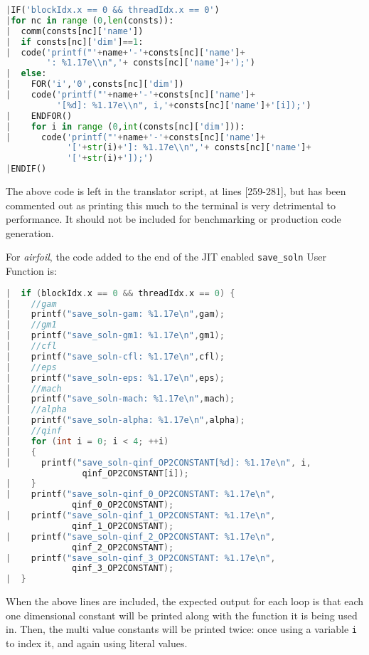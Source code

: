 \begin{lstlisting}[backgroundcolor=\color{lightgray!20}, language=Python]
|IF('blockIdx.x == 0 && threadIdx.x == 0')
|for nc in range (0,len(consts)):
|  comm(consts[nc]['name'])
|  if consts[nc]['dim']==1:
|  code('printf("'+name+'-'+consts[nc]['name']+
        ': %1.17e\\n",'+ consts[nc]['name']+');')
|  else:
|    FOR('i','0',consts[nc]['dim'])
|    code('printf("'+name+'-'+consts[nc]['name']+
          '[%d]: %1.17e\\n", i,'+consts[nc]['name']+'[i]);')
|    ENDFOR()
|    for i in range (0,int(consts[nc]['dim'])):
|      code('printf("'+name+'-'+consts[nc]['name']+
            '['+str(i)+']: %1.17e\\n",'+ consts[nc]['name']+
            '['+str(i)+']);')
|ENDIF()
\end{lstlisting}
The above code is left in the translator script, at lines [259-281], but has been commented out as printing this much to the terminal is very detrimental to performance. It should not be included for benchmarking or production code generation.
\par
For \textit{airfoil}, the code added to the end of the JIT enabled \verb|save_soln| User Function is:
\begin{lstlisting}[backgroundcolor=\color{red!20},language=C]
|  if (blockIdx.x == 0 && threadIdx.x == 0) {
|    //gam
|    printf("save_soln-gam: %1.17e\n",gam);
|    //gm1
|    printf("save_soln-gm1: %1.17e\n",gm1);
|    //cfl
|    printf("save_soln-cfl: %1.17e\n",cfl);
|    //eps
|    printf("save_soln-eps: %1.17e\n",eps);
|    //mach
|    printf("save_soln-mach: %1.17e\n",mach);
|    //alpha
|    printf("save_soln-alpha: %1.17e\n",alpha);
|    //qinf
|    for (int i = 0; i < 4; ++i)
|    {
|      printf("save_soln-qinf_OP2CONSTANT[%d]: %1.17e\n", i,
               qinf_OP2CONSTANT[i]);
|    }
|    printf("save_soln-qinf_0_OP2CONSTANT: %1.17e\n",
             qinf_0_OP2CONSTANT);
|    printf("save_soln-qinf_1_OP2CONSTANT: %1.17e\n",
             qinf_1_OP2CONSTANT);
|    printf("save_soln-qinf_2_OP2CONSTANT: %1.17e\n",
             qinf_2_OP2CONSTANT);
|    printf("save_soln-qinf_3_OP2CONSTANT: %1.17e\n",
             qinf_3_OP2CONSTANT);
|  }
\end{lstlisting}
When the above lines are included, the expected output for each loop is that each one dimensional constant will be printed along with the function it is being used in. Then, the multi value constants will be printed twice: once using a variable \verb|i| to index it, and again using literal values.
